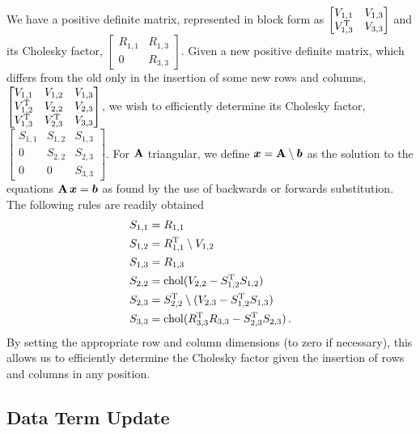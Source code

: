 \documentclass{acmtrans2m}
\begin{document}
\noindent We have a positive definite matrix, represented in block form as $\begin{bmatrix} V_{1,1} & V_{1,3} \\ V^{\mathrm{T}}_{1,3} & V_{3,3} \end{bmatrix}$ and its Cholesky factor, $\begin{bmatrix} R_{1,1} & R_{1,3} \\ 0 & R_{3,3} \end{bmatrix}$. Given a new positive definite matrix, which differs from the old only in the insertion of some new rows and columns,$\begin{bmatrix} V_{1,1} & V_{1,2} & V_{1,3} \\ V^{\mathrm{T}}_{1,2} & V_{2,2} & V_{2,3} \\ V^{\mathrm{T}}_{1,3} & V^{\mathrm{T}}_{2,3} & V_{3,3} \end{bmatrix}
$, we wish to efficiently determine its Cholesky factor, $\begin{bmatrix} S_{1,1} & S_{1,2} & S_{1,3} \\ 0 & S_{2,2} & S_{2,3} \\ 0 & 0 & S_{3,3} \end{bmatrix}
$. For $\mathbf{A}$ triangular, we define $\boldsymbol{x}=\mathbf{A}\setminus \boldsymbol{b}$ as the solution to the equations $\mathbf{A}\,\boldsymbol{x}=\boldsymbol{b}$ as found by the use of backwards or forwards substitution. The following rules are readily obtained
\begin{align}
 S_{1,1}&=R_{1,1}\\
S_{1,2} &=R^{\mathrm{T}}_{1,1}\setminus V_{1,2}\\
S_{1,3} &=R_{1,3}\\
S_{2,2} &=\operatorname{chol} (V_{2,2}-S^{\mathrm{T}}_{1,2}S_{1,2})\\
S_{2,3} &=S^{\mathrm{T}}_{2,2}\setminus (V_{2,3}-S^{\mathrm{T}}_{1,2}S_{1,3})\\
S_{3,3} &=\operatorname{chol} (R^{\mathrm{T}}_{3,3}R_{3,3}-S^{\mathrm{T}}_{2,3}S_{2,3}) \,.
\end{align}
By setting the appropriate row and column dimensions (to zero if necessary), this allows us to efficiently determine the Cholesky factor given the insertion of rows and columns in any position. 

\subsection{Data Term Update} \label{sec:DataTermUpdate}
\end{document}
